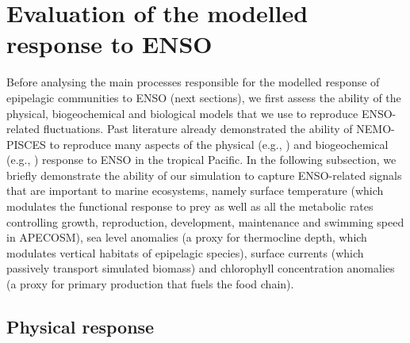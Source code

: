 
\section{Evaluation of the modelled response to ENSO}
\label{sec:model-val}

Before analysing the main processes responsible for the modelled response of epipelagic communities to ENSO (next sections), we first assess the ability of the physical, biogeochemical and biological models that we use to reproduce ENSO-related fluctuations. Past literature already demonstrated the ability of NEMO-PISCES to reproduce many aspects of the physical (e.g., \citealt{vialardModelStudyOceanic2001, lengaigneMechanismsControllingWarm2012, drushkaProcessesDrivingIntraseasonal2015, puyModulationEquatorialPacific2019}) and biogeochemical (e.g., \citealt{ masottiLargescaleShiftsPhytoplankton2011,gorguesRevisitingNina19982010, martinezReconstructingGlobalChlorophylla2020}) response to ENSO in the tropical Pacific. In the following subsection, we briefly demonstrate the ability of our simulation to capture ENSO-related signals that are important to marine ecosystems, namely surface temperature (which modulates the functional response to prey as well as all the metabolic rates controlling growth, reproduction, development, maintenance and swimming speed in APECOSM), sea level anomalies (a proxy for thermocline depth, which modulates vertical habitats of epipelagic species), surface currents (which passively transport simulated biomass) and chlorophyll concentration anomalies (a proxy for primary production that fuels the food chain).

\subsection{Physical response}

